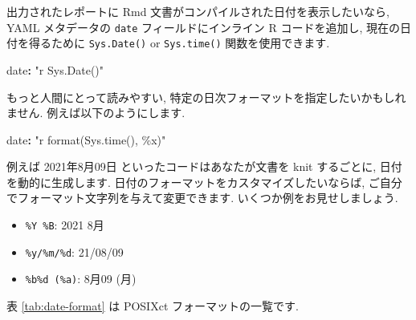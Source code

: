 \documentclass[
  11pt,
  lualatex,ja=standard,jafont=noto]{bxjsreport}
\newenvironment{Shaded}{\begin{snugshade}}{\end{snugshade}}
\newcommand{\AttributeTok}[1]{\textcolor[rgb]{0.77,0.63,0.00}{#1}}
\newcommand{\FunctionTok}[1]{\textcolor[rgb]{0.00,0.00,0.00}{#1}}
\newcommand{\KeywordTok}[1]{\textcolor[rgb]{0.13,0.29,0.53}{\textbf{#1}}}
\newcommand{\StringTok}[1]{\textcolor[rgb]{0.31,0.60,0.02}{#1}}
\providecommand{\tightlist}{%
  \setlength{\itemsep}{0pt}\setlength{\parskip}{0pt}}
\begin{document}
出力されたレポートに Rmd 文書がコンパイルされた日付を表示したいなら, YAML メタデータの \texttt{date} フィールドにインライン R コードを追加し, 現在の日付を得るために \texttt{Sys.Date()} or \texttt{Sys.time()} 関数を使用できます.

\begin{Shaded}
\begin{Highlighting}[]
\FunctionTok{date}\KeywordTok{:}\AttributeTok{ }\StringTok{"\textasciigrave{}r Sys.Date()\textasciigrave{}"}
\end{Highlighting}
\end{Shaded}

もっと人間にとって読みやすい, 特定の日次フォーマットを指定したいかもしれません. 例えば以下のようにします.

\begin{Shaded}
\begin{Highlighting}[]
\FunctionTok{date}\KeywordTok{:}\AttributeTok{ }\StringTok{"\textasciigrave{}r format(Sys.time(), \textquotesingle{}\%x\textquotesingle{})\textasciigrave{}"}
\end{Highlighting}
\end{Shaded}

例えば 2021年8月09日 といったコードはあなたが文書を knit するごとに, 日付を動的に生成します. 日付のフォーマットをカスタマイズしたいならば, ご自分でフォーマット文字列を与えて変更できます. いくつか例をお見せしましょう.

\begin{itemize}
\tightlist
\item
  \texttt{\%Y \%B}: 2021 8月
\item
  \texttt{\%y/\%m/\%d}: 21/08/09
\item
  \texttt{\%b\%d (\%a)}: 8月09 (月)
\end{itemize}

表 \ref{tab:date-format} は POSIXct フォーマットの一覧です.
\end{document}
